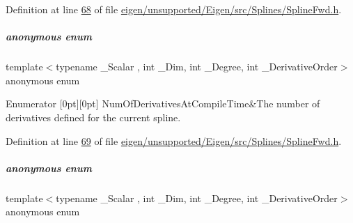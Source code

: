 Definition at line \hyperlink{eigen_2unsupported_2_eigen_2src_2_splines_2_spline_fwd_8h_source_l00068}{68} of file \hyperlink{eigen_2unsupported_2_eigen_2src_2_splines_2_spline_fwd_8h_source}{eigen/unsupported/\+Eigen/src/\+Splines/\+Spline\+Fwd.\+h}.

\mbox{\label{group___splines___module_a4d9e1645a8314bc4c966de73982d232a}} 
\subparagraph{\texorpdfstring{anonymous enum}{anonymous enum}}
{\footnotesize\ttfamily template$<$typename \+\_\+\+Scalar , int \+\_\+\+Dim, int \+\_\+\+Degree, int \+\_\+\+Derivative\+Order$>$ \\
anonymous enum}

\begin{DoxyEnumFields}{Enumerator}
[0pt][0pt]{}\mbox{\label{group___splines___module_a96228f861ee39497b9092c6fd20eed35a24665032b11607201b7f394588f03f05}} 
Num\+Of\+Derivatives\+At\+Compile\+Time&The number of derivatives defined for the current spline. \\
\hline

\end{DoxyEnumFields}


Definition at line \hyperlink{eigen_2unsupported_2_eigen_2src_2_splines_2_spline_fwd_8h_source_l00069}{69} of file \hyperlink{eigen_2unsupported_2_eigen_2src_2_splines_2_spline_fwd_8h_source}{eigen/unsupported/\+Eigen/src/\+Splines/\+Spline\+Fwd.\+h}.

\mbox{\label{group___splines___module_ad4f524df329f825372d7f577f0cbe23a}} 
\subparagraph{\texorpdfstring{anonymous enum}{anonymous enum}}
{\footnotesize\ttfamily template$<$typename \+\_\+\+Scalar , int \+\_\+\+Dim, int \+\_\+\+Degree, int \+\_\+\+Derivative\+Order$>$ \\
anonymous enum}

